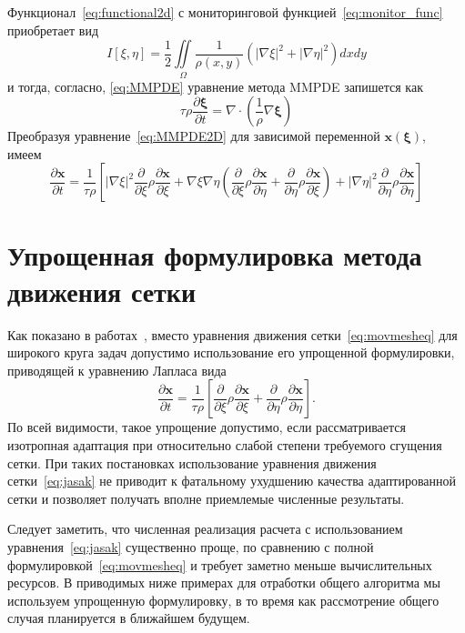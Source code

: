 Функционал~\eqref{eq:functional2d} с мониторинговой функцией~\eqref{eq:monitor_func} приобретает вид 
\begin{equation}
I[\xi,\eta] = \frac{1}{2}\iint\limits_{\Omega}\frac{1}{\rho(x,y)}\left(|\nabla \xi|^2+|\nabla \eta|^2\right)dxdy
\label{eq:2Dfunctional}
\end{equation}
и тогда, согласно, \eqref{eq:MMPDE} уравнение метода MMPDE запишется как 
\begin{equation}
\tau \rho\frac{\partial \boldsymbol\xi}{\partial t} = \nabla\cdot\left(\frac{1}{\rho}\nabla \boldsymbol\xi \right)
\label{eq:MMPDE2D}
\end{equation}
Преобразуя уравнение~\eqref{eq:MMPDE2D} для зависимой переменной  $\mathbf{x}( \boldsymbol\xi)$, имеем~\cite{huang_practical_2001}
\begin{equation}\label{eq:movmesheq}
\frac{\partial \mathbf{x}}{\partial t} = \frac{1}{\tau \rho} 
\left[
|\nabla \xi|^2 \frac{\partial }{\partial \xi}\rho \frac{\partial \mathbf{x}}{\partial \xi} +
\nabla \xi \nabla\eta \left( \frac{\partial }{\partial \xi}\rho \frac{\partial \mathbf{x}}{\partial \eta} +\frac{\partial }{\partial \eta}\rho \frac{\partial \mathbf{x}}{\partial \xi} \right) +
|\nabla \eta|^2 \frac{\partial }{\partial \eta}\rho \frac{\partial \mathbf{x}}{\partial \eta}
\right]
\end{equation}

\section{Упрощенная формулировка метода движения сетки}
Как показано в работах~\cite{jasak_automatic_2006, tukovic_moving_2012}, вместо уравнения движения сетки~\eqref{eq:movmesheq} для широкого круга задач допустимо использование его упрощенной формулировки, приводящей к уравнению Лапласа вида
\begin{equation}\label{eq:jasak}
\frac{\partial \mathbf{x}}{\partial t} = \frac{1}{\tau \rho} 
\left[
 \frac{\partial }{\partial \xi}\rho \frac{\partial \mathbf{x}}{\partial \xi} +
 \frac{\partial }{\partial \eta}\rho \frac{\partial \mathbf{x}}{\partial \eta}
\right].
\end{equation}
По всей видимости, такое упрощение допустимо, если рассматривается изотропная адаптация при относительно слабой степени требуемого сгущения сетки. При таких постановках использование уравнения движения сетки~\eqref{eq:jasak} не приводит к фатальному ухудшению качества адаптированной сетки и позволяет получать вполне приемлемые численные результаты. 

Следует заметить, что численная реализация расчета с использованием уравнения~\eqref{eq:jasak} существенно проще, по сравнению с полной формулировкой~\eqref{eq:movmesheq} и требует заметно меньше вычислительных ресурсов. В приводимых ниже примерах для отработки общего алгоритма мы используем упрощенную формулировку, в то время как рассмотрение общего случая планируется в ближайшем будущем.
